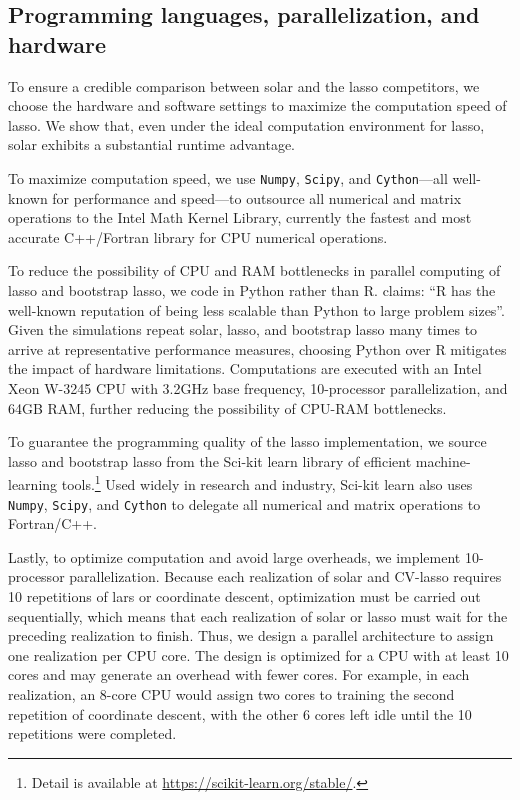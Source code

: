 \documentclass[11pt,review,authoryear]{elsarticle}
\begin{document}
\subsection{Programming languages, parallelization, and hardware}

To ensure a credible comparison between solar and the lasso competitors, we choose the hardware and software settings to maximize the computation speed of lasso. We show that, even under the ideal computation environment for lasso, solar exhibits a substantial runtime advantage.

To maximize computation speed, we use \texttt{Numpy}, \texttt{Scipy}, and \texttt{Cython}---all well-known for performance and speed---to outsource all numerical and matrix operations to the Intel Math Kernel Library, currently the fastest and most accurate C++/Fortran library for CPU numerical operations.

To reduce the possibility of CPU and RAM bottlenecks in parallel computing of lasso and bootstrap lasso, we code in Python rather than R. \citet{donoho201750} claims: ``R has the well-known reputation of being less scalable than Python to large problem sizes''. Given the simulations repeat solar, lasso, and bootstrap lasso many times to arrive at representative performance measures, choosing Python over R mitigates the impact of hardware limitations. Computations are executed with an Intel Xeon W-3245 CPU with 3.2GHz base frequency, 10-processor parallelization, and 64GB RAM, further reducing the possibility of CPU-RAM bottlenecks.

To guarantee the programming quality of the lasso implementation, we source lasso and bootstrap lasso from the Sci-kit learn library \citep{scikit-learn} of efficient machine-learning tools.\footnote{Detail is available at \url{https://scikit-learn.org/stable/}.} Used widely in research and industry, Sci-kit learn also uses \texttt{Numpy}, \texttt{Scipy}, and \texttt{Cython} to delegate all numerical and matrix operations to Fortran/C++.

Lastly, to optimize computation and avoid large overheads, we implement 10-processor parallelization. Because each realization of solar and CV-lasso requires 10 repetitions of lars or coordinate descent, optimization must be carried out sequentially, which means that each realization of solar or lasso must wait for the preceding realization to finish. Thus, we design a parallel architecture to assign one realization per CPU core. The design is optimized for a CPU with at least 10 cores and may generate an overhead with fewer cores. For example, in each realization, an 8-core CPU would assign two cores to training the second repetition of coordinate descent, with the other 6 cores left idle until the 10 repetitions were completed.
\end{document}
